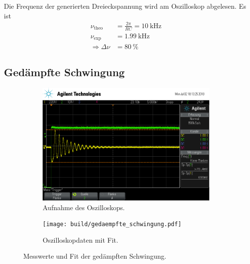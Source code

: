 Die Frequenz der generierten Dreieckspannung wird am Oszilloskop abgelesen.
Es ist
\begin{align*}
  \nu_\text{theo} &= \frac{2 \pi}{RC} = \SI{10}{\kilo\hertz} \\
  \nu_\text{exp}  &= \SI{1.99}{\kilo\hertz} \\
  \Rightarrow \Delta \nu &= \SI{80}{\percent}
\end{align*}

\subsection{Ged\"ampfte Schwingung}

\begin{figure}[ht]
  \centering
  \begin{subfigure}{\textwidth}
    \centering
    \includegraphics[height=0.3\textheight]{data/scope_275.png}
    \caption{Aufnahme des Oszilloskops.}%
    \label{fig:gedaempft_oszilloskop}
  \end{subfigure}
  \begin{subfigure}{\textwidth}
    \centering
    \texttt{[image: build/gedaempfte\_schwingung.pdf]}
    \caption{Oszilloskopdaten mit Fit.}%
    \label{fig:gedaempft_fit}
  \end{subfigure}
  \caption{Messwerte und Fit der gedämpften Schwingung.}%
  \label{fig:gedaempft}
\end{figure}

